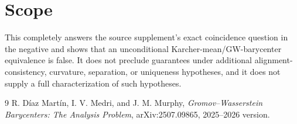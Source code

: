 \documentclass[11pt]{article}
\begin{document}
\section{Scope}

This completely answers the source supplement's exact coincidence question
in the negative and shows that an unconditional Karcher-mean/GW-barycenter
equivalence is false. It does not preclude guarantees under additional
alignment-consistency, curvature, separation, or uniqueness hypotheses, and
it does not supply a full characterization of such hypotheses.

\begin{thebibliography}{9}
R. D\'iaz Mart\'in, I. V. Medri, and J. M. Murphy,
\emph{Gromov--Wasserstein Barycenters: The Analysis Problem},
arXiv:2507.09865, 2025--2026 version.
\end{thebibliography}
\end{document}
